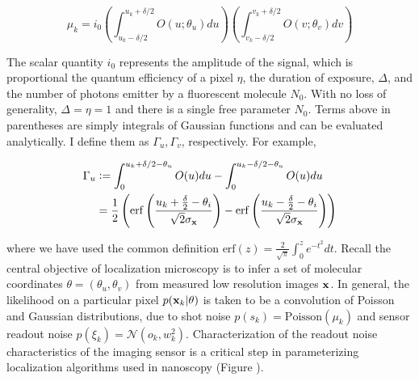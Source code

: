 \begin{equation*}
\mu_{k} = i_{0}\left(\int_{u_{k}-\delta /2}^{u_{k}+\delta /2} O(u; \theta_{u})du \right)\left(\int_{v_{k}-\delta /2}^{v_{k}+\delta /2} O(v;\theta_{v})dv \right)
\end{equation*}

The scalar quantity $i_{0}$ represents the amplitude of the signal, which is proportional the quantum efficiency of a pixel $\eta$, the duration of exposure, $\Delta$, and the number of photons emitter by a fluorescent molecule $N_{0}$. With no loss of generality, $\Delta = \eta = 1$ and there is a single free parameter $N_{0}$. Terms above in parentheses are simply integrals of Gaussian functions and can be evaluated analytically. I define them as $\Gamma_{u},\Gamma_{v}$, respectively. For example,

\begin{align*}
\Gamma_{u} &\vcentcolon =  \int_{0}^{u_{k}+\delta /2 - \theta_{u}} O(u)du - \int_{0}^{u_{k}-\delta /2 - \theta_{u}} O(u)du\\
&= \frac{1}{2}\left(\mathrm{erf}\left(\frac{u_{k}+\frac{\delta}{2}-\theta_{i}}{\sqrt{2}\sigma_{\bold{x}}}\right) -\mathrm{erf}\left(\frac{u_{k}-\frac{\delta}{2}-\theta_{i}}{\sqrt{2}\sigma_{\bold{x}}}\right)\right)
\end{align*}

where we have used the common definition $\mathrm{erf}(z) = \frac{2}{\sqrt{\pi}}\int_{0}^{z}e^{-t^{2}}dt$. Recall the central objective of localization microscopy is to infer a set of molecular coordinates $\theta=(\theta_{u},\theta_{v})$ from measured low resolution images $\bold{x}$. In general, the likelihood on a particular pixel $p(\bold{x}_k\lvert\theta)$ is taken to be a convolution of Poisson and Gaussian distributions, due to shot noise $p(s_{k}) = \mathrm{Poisson}(\mu_{k})$ and sensor readout noise $p(\xi_{k}) = \mathcal{N}(o_{k},w_{k}^{2})$. Characterization of the readout noise characteristics of the imaging sensor is a critical step in parameterizing localization algorithms used in nanoscopy (Figure \label{fig:fig2}). 

